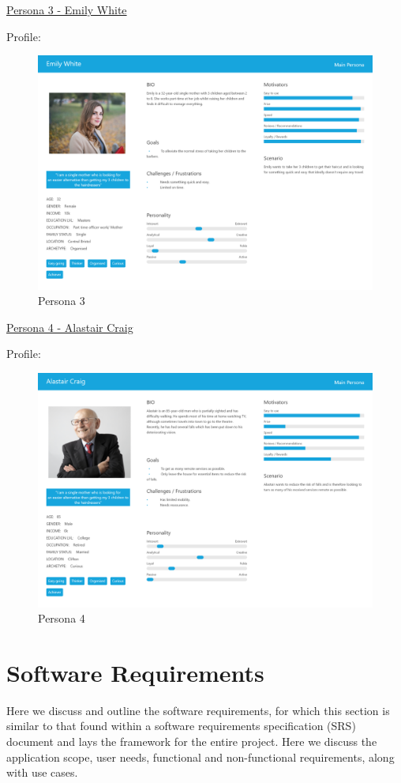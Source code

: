 \documentclass[12pt]{article}
\begin{document}
		\underline{Persona 3 - Emily White}
		
		Profile: 
		\begin{figure}[H]			
			\includegraphics[scale=0.2]{images/persona_3.png}
			\caption{Persona 3}
			\label{fig:persona_3}
		\end{figure}
		
		\underline{Persona 4 - Alastair Craig}
		
		
		Profile: 
		\begin{figure}[H]			
			\includegraphics[scale=0.2]{images/persona_4.png}
			\caption{Persona 4}
			\label{fig:persona_4}
		\end{figure}
			

	\section{Software Requirements}
	Here we discuss and outline the software requirements, for which this section is similar to that found within a software requirements specification (SRS) document and lays the framework for the entire project. Here we discuss the application scope, user needs, functional and non-functional requirements, along with use cases.
	
\end{document}
